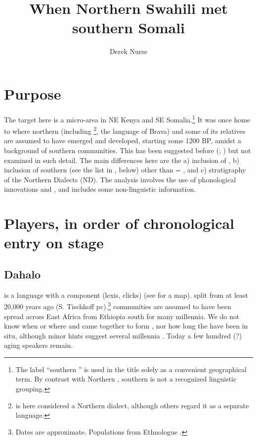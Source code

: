 \documentclass[output=paper,newtxmath,modfonts,nonflat,hidelinks]{langsci/langscibook}
\title{When Northern Swahili met southern Somali}
\author{Derek Nurse}
\begin{document}
\maketitle


\section{Purpose}\label{sec:nurse:1} 

The target here is a micro-area in NE Kenya and SE Somalia.\footnote{The label “southern ” is used in the title solely as a convenient geographical term. By contrast with Northern , southern  is not a recognized linguistic grouping.} It was once home to where northern  (including \footnote{ is here considered a Northern  dialect, although others regard it as a separate language.}, the language of Brava) and some of its relatives are assumed to have emerged and developed, starting some 1200 BP, amidst a background of southern  communities. This has been suggested before (\citealt{Nurse1983}; \citeyear{Nurse1985}) but not examined in such detail. The main differences here are the a) inclusion of , b) inclusion of southern  (see the list in , below) other than  = , and c) stratigraphy of the Northern  Dialects (ND). The analysis involves the use of phonological innovations and , and includes some non-linguistic information.

\section{Players, in order of chronological entry on stage}\label{sec:nurse:2}

\subsection{Dahalo}\label{sec:nurse:2.1} 

 is a  language with a  component (lexis, clicks) (see  for a map).  split from  at least 20,000 years ago (S. Tischkoff pc).\footnote{Dates are approximate. Populations from Ethnologue \citep{Lewis2015}.}   communities are assumed to have been spread across East Africa from Ethiopia south for many millennia. We do not know when or where  and  came together to form , nor how long the  have been in situ, although minor hints suggest several millennia \citep{Nurse1986}. Today a few hundred (?) aging  speakers remain. 
\end{document}
